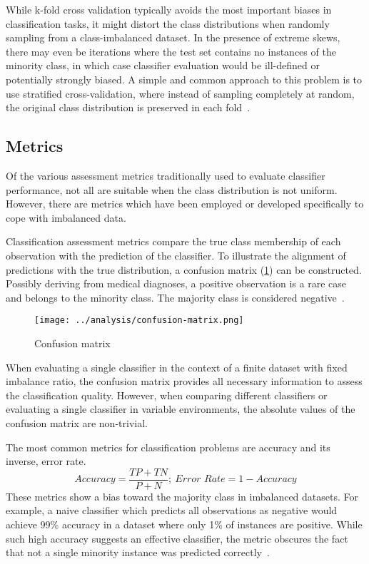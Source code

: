 \documentclass[sort&compress]{elsarticle}
\begin{document}
While k-fold cross validation typically avoids the most important biases in
classification tasks, it might distort the class distributions when randomly
sampling from a class-imbalanced dataset. In the presence of extreme skews,
there may even be iterations where the test set contains no instances of the
minority class, in which case classifier evaluation would be ill-defined or
potentially strongly biased. A simple and common approach to this problem is to
use stratified cross-validation, where instead of sampling completely at random,
the original class distribution is preserved in each
fold~\citep{Japkowicz.2013}.

	\subsection{Metrics}
	Of the various assessment metrics traditionally used to evaluate classifier
	performance, not all are suitable when the class distribution is not
	uniform. However, there are metrics which have been employed or developed
	specifically to cope with imbalanced data.

	Classification assessment metrics compare the true class membership of each
	observation with the prediction of the classifier. To illustrate the
	alignment of predictions with the true distribution, a confusion matrix
	(\cref{fig:confusion-matrix}) can be constructed.	Possibly deriving from
	medical diagnoses, a positive observation is a rare case and belongs to the
	minority class. The majority class is considered
	negative~\citep{Japkowicz.2013}.

	\begin{figure}[ht]
	\centering
	\texttt{[image: ../analysis/confusion-matrix.png]}
	\caption{Confusion matrix}
    \label{fig:confusion-matrix}
	\end{figure}
	
	When evaluating a single classifier in the context of a finite dataset with
	fixed imbalance ratio, the confusion matrix provides all necessary
	information to assess the classification quality. However, when comparing
	different classifiers or evaluating a single classifier in variable
	environments, the absolute values of the confusion matrix are non-trivial.

	The most common metrics for classification problems are accuracy and its
	inverse, error rate.
	\begin{equation}
	Accuracy = \frac{TP + TN}{P + N};\ \textit{Error Rate} = 1 - Accuracy
	\end{equation}
	These metrics show a bias toward the majority class in imbalanced datasets.
	For example, a naive classifier which predicts all observations as negative
	would achieve 99\% accuracy in a dataset where only 1\% of instances are
	positive. While such high accuracy suggests an effective classifier, the
	metric obscures the fact that not a single minority instance was predicted
	correctly~\citep{He.2009}.
\end{document}
